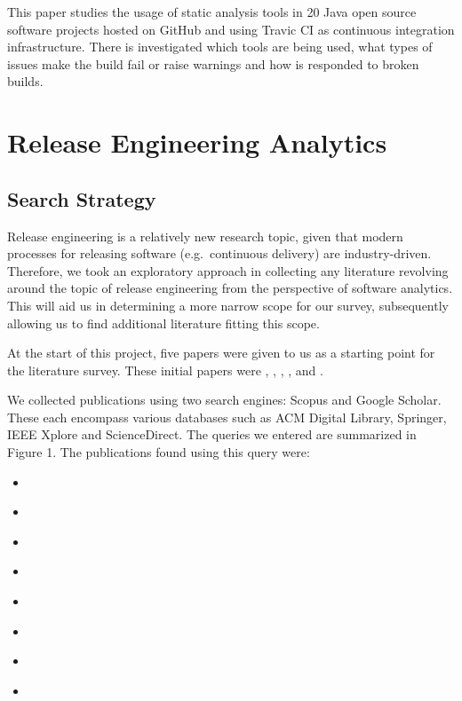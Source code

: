 \documentclass[]{book}
\providecommand{\tightlist}{%
  \setlength{\itemsep}{0pt}\setlength{\parskip}{0pt}}
\begin{document}
This paper studies the usage of static analysis tools in 20 Java open
source software projects hosted on GitHub and using Travic CI as
continuous integration infrastructure. There is investigated which tools
are being used, what types of issues make the build fail or raise
warnings and how is responded to broken builds.

\chapter{Release Engineering
Analytics}\label{release-engineering-analytics}

\section{Search Strategy}\label{search-strategy-1}

Release engineering is a relatively new research topic, given that
modern processes for releasing software (e.g.~continuous delivery) are
industry-driven. Therefore, we took an exploratory approach in
collecting any literature revolving around the topic of release
engineering from the perspective of software analytics. This will aid us
in determining a more narrow scope for our survey, subsequently allowing
us to find additional literature fitting this scope.

At the start of this project, five papers were given to us as a starting
point for the literature survey. These initial papers were
\citet{adams2016a}, \citet{da2016a}, \citet{d2014a}, \citet{khomh2012a},
and \citet{khomh2015a}.

We collected publications using two search engines: Scopus and Google
Scholar. These each encompass various databases such as ACM Digital
Library, Springer, IEEE Xplore and ScienceDirect. The queries we entered
are summarized in Figure 1. The publications found using this query
were:

\begin{itemize}
\tightlist
\item
  \citet{kaur2019a}
\item
  \citet{kerzazi2013a}
\item
  \citet{castelluccio2017a}
\item
  \citet{karvonen2017a}
\item
  \citet{claes2017a}
\item
  \citet{fujibayashi2017a}
\item
  \citet{souza2015a}
\item
  \citet{laukkanen2018a}
\end{itemize}
\end{document}
